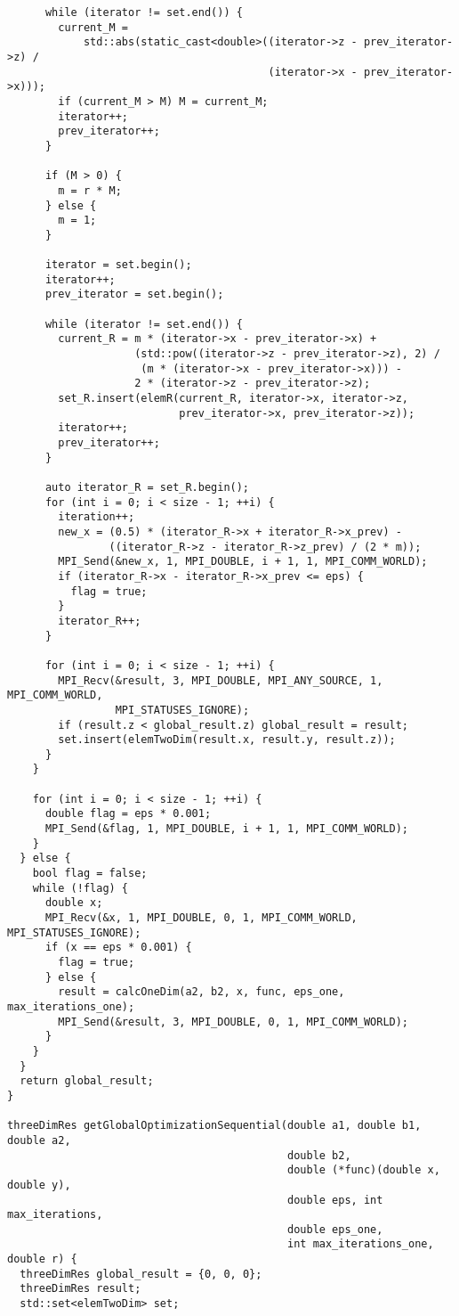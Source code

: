 \documentclass{report}
\begin{document}
\begin{lstlisting}
      while (iterator != set.end()) {
        current_M =
            std::abs(static_cast<double>((iterator->z - prev_iterator->z) /
                                         (iterator->x - prev_iterator->x)));
        if (current_M > M) M = current_M;
        iterator++;
        prev_iterator++;
      }

      if (M > 0) {
        m = r * M;
      } else {
        m = 1;
      }

      iterator = set.begin();
      iterator++;
      prev_iterator = set.begin();

      while (iterator != set.end()) {
        current_R = m * (iterator->x - prev_iterator->x) +
                    (std::pow((iterator->z - prev_iterator->z), 2) /
                     (m * (iterator->x - prev_iterator->x))) -
                    2 * (iterator->z - prev_iterator->z);
        set_R.insert(elemR(current_R, iterator->x, iterator->z,
                           prev_iterator->x, prev_iterator->z));
        iterator++;
        prev_iterator++;
      }

      auto iterator_R = set_R.begin();
      for (int i = 0; i < size - 1; ++i) {
        iteration++;
        new_x = (0.5) * (iterator_R->x + iterator_R->x_prev) -
                ((iterator_R->z - iterator_R->z_prev) / (2 * m));
        MPI_Send(&new_x, 1, MPI_DOUBLE, i + 1, 1, MPI_COMM_WORLD);
        if (iterator_R->x - iterator_R->x_prev <= eps) {
          flag = true;
        }
        iterator_R++;
      }

      for (int i = 0; i < size - 1; ++i) {
        MPI_Recv(&result, 3, MPI_DOUBLE, MPI_ANY_SOURCE, 1, MPI_COMM_WORLD,
                 MPI_STATUSES_IGNORE);
        if (result.z < global_result.z) global_result = result;
        set.insert(elemTwoDim(result.x, result.y, result.z));
      }
    }

    for (int i = 0; i < size - 1; ++i) {
      double flag = eps * 0.001;
      MPI_Send(&flag, 1, MPI_DOUBLE, i + 1, 1, MPI_COMM_WORLD);
    }
  } else {
    bool flag = false;
    while (!flag) {
      double x;
      MPI_Recv(&x, 1, MPI_DOUBLE, 0, 1, MPI_COMM_WORLD, MPI_STATUSES_IGNORE);
      if (x == eps * 0.001) {
        flag = true;
      } else {
        result = calcOneDim(a2, b2, x, func, eps_one, max_iterations_one);
        MPI_Send(&result, 3, MPI_DOUBLE, 0, 1, MPI_COMM_WORLD);
      }
    }
  }
  return global_result;
}

threeDimRes getGlobalOptimizationSequential(double a1, double b1, double a2,
                                            double b2,
                                            double (*func)(double x, double y),
                                            double eps, int max_iterations,
                                            double eps_one,
                                            int max_iterations_one, double r) {
  threeDimRes global_result = {0, 0, 0};
  threeDimRes result;
  std::set<elemTwoDim> set;


\end{lstlisting}
\end{document}
